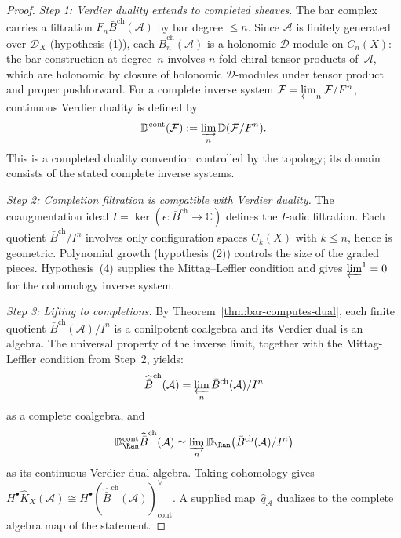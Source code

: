 \begin{proof}
\emph{Step 1: Verdier duality extends to completed sheaves.}
The bar complex carries a filtration
$F_n \bar{B}^{\text{ch}}(\mathcal{A})$ by bar degree $\leq n$.
Since $\mathcal{A}$ is finitely generated over $\mathcal{D}_X$
(hypothesis (1)), each $\bar{B}^{\text{ch}}_n(\mathcal{A})$ is a
holonomic $\mathcal{D}$-module on $\overline{C}_n(X)$: the bar
construction at degree~$n$ involves $n$-fold chiral tensor products
of~$\mathcal{A}$, which are holonomic by closure of holonomic
$\mathcal{D}$-modules under tensor product and proper pushforward.
For a complete inverse system
$\mathcal{F}=\varprojlim_n\mathcal{F}/F^n$, continuous Verdier
duality is defined by
\[
\mathbb{D}^{\mathrm{cont}}(\mathcal{F})
:=\varinjlim_n\mathbb{D}(\mathcal{F}/F^n).
\]
This is a completed duality convention controlled by the topology;
its domain consists of the stated complete inverse systems.

\emph{Step 2: Completion filtration is compatible with Verdier duality.}
The coaugmentation ideal
$I=\ker(\epsilon:\bar{B}^{\text{ch}}\to\mathbb{C})$ defines the
$I$-adic filtration. Each quotient $\bar{B}^{\text{ch}}/I^n$
involves only configuration spaces $C_k(X)$ with $k\leq n$, hence is
geometric. Polynomial growth (hypothesis (2)) controls the size of
the graded pieces.  Hypothesis~(4) supplies the Mittag--Leffler
condition and gives
$\varprojlim^1=0$ for the cohomology inverse system.

\emph{Step 3: Lifting to completions.}
By Theorem~\ref{thm:bar-computes-dual}, each finite quotient
$\bar{B}^{\mathrm{ch}}(\mathcal{A})/I^n$ is a conilpotent
coalgebra and its Verdier dual is an algebra. The universal
property of the inverse limit, together with the Mittag-Leffler
condition from Step~2, yields:
\[
\widehat{\bar{B}}^{\mathrm{ch}}(\mathcal{A})
=\varprojlim_n \bar{B}^{\mathrm{ch}}(\mathcal{A})/I^n
\]
as a complete coalgebra, and
\[
\mathbb{D}^{\mathrm{cont}}_{\Ran}
\widehat{\bar{B}}^{\mathrm{ch}}(\mathcal{A})
\simeq
\varinjlim_n
\mathbb{D}_{\Ran}\!\left(
\bar{B}^{\mathrm{ch}}(\mathcal{A})/I^n
\right)
\]
as its continuous Verdier-dual algebra. Taking cohomology gives
$H^\bullet\widehat K_X(\mathcal A)\cong
H^\bullet(\widehat{\bar B}^{\mathrm{ch}}(\mathcal A))^\vee_{\mathrm{cont}}$.
A supplied map~$\widehat q_{\mathcal A}$ dualizes to the
complete algebra map of the statement.


\end{proof}
